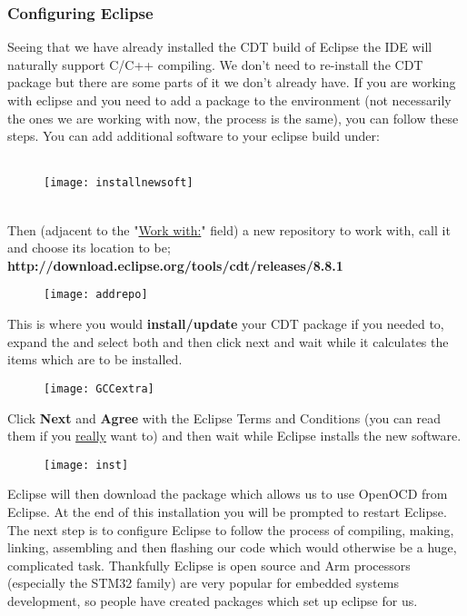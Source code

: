 {{\subsubsection{Configuring Eclipse}
\label{configeclipse}
Seeing that we have already installed the CDT build of Eclipse the IDE will naturally support 
C/C++ compiling. We don't need to re-install the CDT package but there are some parts of it we don't already have. If you are working with eclipse and you need to add a package to the environment (not necessarily the ones we are working with now, the process is the same), you can follow these steps. You can add additional software to your eclipse build under:\\
\-\ \hspace{20pt} 
\begin{figure}[htbp]
\centering
\texttt{[image: installnewsoft]}
\end{figure}
\\
Then  (adjacent to the "\underline{Work with:}" field) a new repository to work with, call it  and choose its location to be;\\
\textbf{\color{Orange}http://download.eclipse.org/tools/cdt/releases/8.8.1}
\par
\begin{figure}[hbtp]
\centering
\texttt{[image: addrepo]}
\end{figure}
\justifying
\parindent=0pt
This is where you would \textbf{install/update} your CDT package if you needed to, expand the  and select both \underline{} and \underline{} \underline{} then click next and wait while it calculates the items which are to be installed.
\begin{figure}[htbp]
\centering
\texttt{[image: GCCextra]}
\end{figure}
\newpage
\parindent=0pt
\par
Click \textbf{\color{Purple} Next} and \textbf{\color{Purple} Agree} with the Eclipse Terms and Conditions (you can read them if you \underline{really} want to) and then wait while Eclipse installs the new software.
\\
\begin{figure}[hbtp]
\centering
\texttt{[image: inst]}
\end{figure}
Eclipse will then download the  package which allows us to use OpenOCD from Eclipse. At the end of this installation you will be prompted to restart Eclipse. The next step is to configure Eclipse to follow the process of compiling, making, linking, assembling and then flashing our code which would otherwise be a huge, complicated task. Thankfully Eclipse is open source and Arm processors (especially the STM32 family) are very popular for embedded systems development, so people have created packages which set up eclipse for us.
}}
